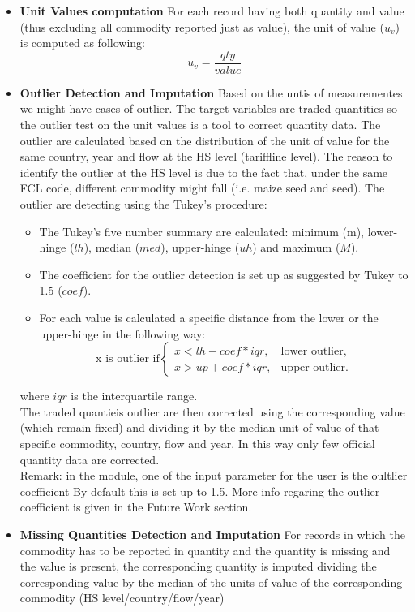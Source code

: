 \documentclass[nojss]{jss}\usepackage[]{graphicx}\usepackage[]{color}
\begin{document}
\begin{itemize}
\item {\bf Unit Values computation} For each record having both quantity and value (thus excluding all commodity reported just as value), the unit of value ($u_v$) is computed as following:
\begin{equation}
u_v = \frac{qty}{value}
\end{equation}

\item {\bf Outlier Detection and Imputation} Based on the untis of measurementes we might have cases of outlier. The target variables are traded quantities so the outlier test on the unit values is a tool to correct quantity data. The outlier are calculated based on the distribution of the unit of value for the same country, year and flow at the HS level (tariffline level). The reason to identify the outlier at the HS level is due to the fact that, under the same FCL code, different commodity might fall (i.e. maize seed and seed). The outlier are detecting using the Tukey's procedure:
\begin{itemize}
\item The Tukey's five number summary are calculated: minimum (m), lower-hinge ($lh$), median ($med$), upper-hinge ($uh$) and maximum ($M$).
\item The coefficient for the outlier detection is set up as suggested by Tukey to 1.5 ($coef$).
\item For each value is calculated a specific distance from the lower or the upper-hinge in the following way:
\begin{equation}
\text{x is outlier if} \begin{cases}
    x < lh - coef * iqr, & \text{lower outlier},\\
    x > up + coef * iqr, & \text{upper outlier}.
  \end{cases}
\end{equation}
\end{itemize}
where $iqr$ is the interquartile range.\\

The traded quantieis outlier are then corrected using the corresponding value (which remain fixed) and dividing it by the median unit of value of that specific commodity, country, flow and year. In this way only few official quantity data are corrected.\\
Remark: in the module, one of the input parameter for the user is the oultlier coefficient By default this is set up to 1.5. More info regaring the outlier coefficient is given in the Future Work section.

\item {\bf Missing Quantities Detection and Imputation} For records in which the commodity has to be reported in quantity and the quantity is missing and the value is present, the corresponding quantity is imputed dividing the corresponding value by the median of the units of value of the corresponding commodity (HS level/country/flow/year)
\end{itemize}
\end{document}
